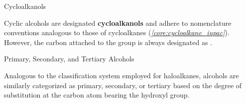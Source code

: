 \documentclass[10pt]{article}
\begin{document}
    \begin{core}{Cycloalkanols}

      Cyclic alcohols are designated \textbf{cycloalkanols} and adhere to nomenclature conventions analogous to those of cycloalkanes (\textit{\autoref{core:cycloalkane_iupac}}). However, the carbon attached to the  group is always designated as . 


    \end{core}

    \begin{core}{Primary, Secondary, and Tertiary Alcohols}

      Analogous to the classification system employed for haloalkanes, alcohols are similarly categorized as primary, secondary, or tertiary based on the degree of substitution at the carbon atom bearing the hydroxyl group.


    \end{core}
\end{document}
